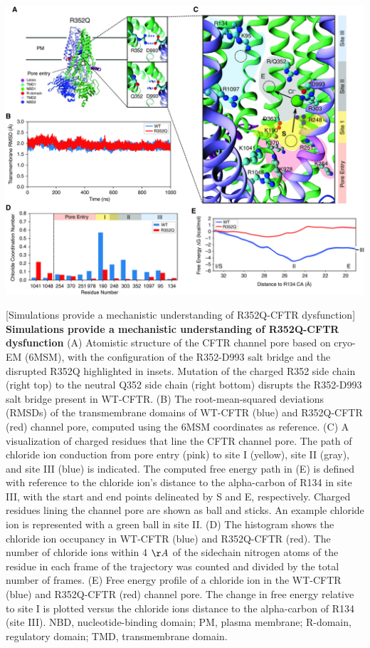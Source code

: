 \begin{center}
	\includegraphics[width=\textwidth]{figures/R352Q/figure_4.jpg}
\end{center}
	\captionsetup{singlelinecheck = false, justification=raggedright}
\begingroup
{}[Simulations provide a mechanistic understanding of R352Q-CFTR dysfunction] {\textbf{Simulations provide a mechanistic understanding of R352Q-CFTR dysfunction}}{ (A) Atomistic structure of the CFTR channel pore based on cryo-EM (6MSM), with the configuration of the R352-D993 salt bridge and the disrupted R352Q highlighted in insets. Mutation of the charged R352 side chain (right top) to the neutral Q352 side chain (right bottom) disrupts the R352-D993 salt bridge present in WT-CFTR. (B) The root-mean-squared deviations (RMSDs) of the transmembrane domains of WT-CFTR (blue) and R352Q-CFTR (red) channel pore, computed using the 6MSM coordinates as reference. (C) A visualization of charged residues that line the CFTR channel pore. The path of chloride ion conduction from pore entry (pink) to site I (yellow), site II (gray), and site III (blue) is indicated. The computed free energy path in (E) is defined with reference to the chloride ion’s distance to the alpha-carbon of R134 in site III, with the start and end points delineated by S and E, respectively. Charged residues lining the channel pore are shown as ball and sticks. An example chloride ion is represented with a green ball in site II. (D) The histogram shows the chloride ion occupancy in WT-CFTR (blue) and R352Q-CFTR (red). The number of chloride ions within 4 $\AA$ of the sidechain nitrogen atoms of the residue in each frame of the trajectory was counted and divided by the total number of frames. (E) Free energy profile of a chloride ion in the WT-CFTR (blue) and R352Q-CFTR (red) channel pore. The change in free energy relative to site I is plotted versus the chloride ions distance to the alpha-carbon of R134 (site III). NBD, nucleotide-binding domain; PM, plasma membrane; R-domain, regulatory domain; TMD, transmembrane domain.}
\label{R352Q_figure_4}
\endgroup

